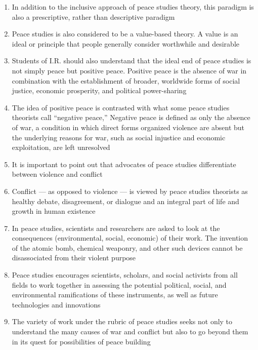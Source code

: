 \documentclass[12pt]{article}
\begin{document}
\begin{enumerate}
      \item In addition to the inclusive approach of peace studies theory, this paradigm is also a prescriptive, rather than descriptive paradigm

      \item Peace studies is also considered to be a value-based theory.  A value is an ideal or principle that people generally consider worthwhile and desirable

      \item Students of I.R. should also understand that the ideal end of peace studies is not simply peace but positive peace. Positive peace is the absence of war in combination with the establishment of broader, worldwide forms of social justice, economic prosperity, and political power-sharing

      \item The idea of positive peace is contrasted with what some peace studies theorists call “negative peace,” Negative peace is defined as only the absence of war, a condition in which direct forms organized violence are absent but the underlying reasons for war, such as social injustice and economic exploitation, are left unresolved

      \item It is important to point out that advocates of peace studies differentiate between violence and conflict

      \item Conflict — as opposed to violence — is viewed by peace studies theorists as healthy debate, disagreement, or dialogue and an integral part of life and growth in human existence

      \item In peace studies, scientists and researchers are asked to look at the consequences (environmental, social, economic) of their work. The invention of the atomic bomb, chemical weaponry, and other such devices cannot be disassociated from their violent purpose

      \item Peace studies encourages scientists, scholars, and social activists from all fields to work together in assessing the potential political, social, and environmental ramifications of these instruments, as well as future technologies and innovations

      \item The variety of work under the rubric of peace studies seeks not only to understand the many causes of war and conflict but also to go beyond them in its quest for possibilities of peace building


\end{enumerate}
\end{document}
